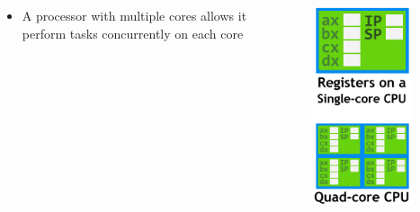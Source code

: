 \documentclass{beamer}
\begin{document}
\begin{frame}
\begin{columns}
\begin{column}{0.78\textwidth}
\begin{itemize}
		\item A processor with multiple cores allows it perform tasks concurrently on each core
		\end{itemize}
	\end{column}
	\begin{column}{0.22\textwidth}
		\begin{figure}
		\includegraphics[width=0.95\textwidth]{Illustrations/Registers}
		\label{fig:registers}
		\end{figure}
	\end{column}
\end{columns}
\end{frame}
\end{document}
